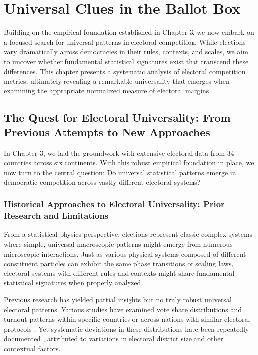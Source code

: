 \chapter{Universal Clues in the Ballot Box}
\label{chap4}

Building on the empirical foundation established in Chapter 3, we now embark on a focused search for universal patterns in electoral competition. While elections vary dramatically across democracies in their rules, contexts, and scales, we aim to uncover whether fundamental statistical signatures exist that transcend these differences. This chapter presents a systematic analysis of electoral competition metrics, ultimately revealing a remarkable universality that emerges when examining the appropriate normalized measure of electoral margins.

\section{The Quest for Electoral Universality: From Previous Attempts to New Approaches}

In Chapter 3, we laid the groundwork with extensive electoral data from 34 countries across six continents. With this robust empirical foundation in place, we now turn to the central question: Do universal statistical patterns emerge in democratic competition across vastly different electoral systems?

\subsection{Historical Approaches to Electoral Universality: Prior Research and Limitations}
From a statistical physics perspective, elections represent classic complex systems where simple, universal macroscopic patterns might emerge from numerous microscopic interactions. Just as various physical systems composed of different constituent particles can exhibit the same phase transitions or scaling laws, electoral systems with different rules and contexts might share fundamental statistical signatures when properly analyzed.

Previous research has yielded partial insights but no truly robust universal electoral patterns. Various studies have examined vote share distributions and turnout patterns within specific countries \cite{CosAlmAnd1999, ForCas2007, BorBou2010} or across nations with similar electoral protocols \cite{ForCas2007, ChaMitFor2013}. Yet systematic deviations in these distributions have been repeatedly documented \cite{ChaMitFor2013, Kon2017, Kon2019, CalCroAnt2015, BorRayBou2012}, attributed to variations in electoral district size and other contextual factors.

